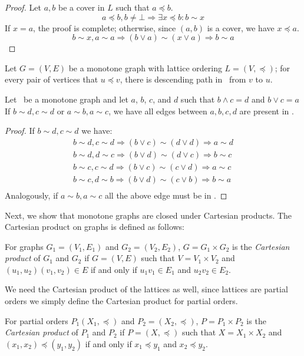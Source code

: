 \begin{proof}
Let \(a,b\) be a cover in \(L\) such that \(a \preceq b\)\@.
\[a \preceq b, b\neq \bot \Rightarrow \exists x \preceq b: b\sim x\]
If \(x=a\), the proof is complete; otherwise, since \((a,b)\) is a cover, we have \(x\preceq a\).
\[b\sim x,a\sim a \Rightarrow (b \vee a) \sim (x \vee a) \Rightarrow b\sim a\]\@
\end{proof}

\begin{cor}
Let \(G=(V,E)\) be a monotone graph with lattice ordering \(L=(V, \preceq)\);
for every pair of vertices that \(u\preceq v\), there is descending path in \mG\ from
\(v\) to \(u\)\@. 
\end{cor}

\begin{lemma}
Let \mG\ be a monotone graph and let
\(a\), \(b\), \(c\), and \(d\) such that \(b \wedge c = d\) and \(b \vee c = a\)
If \(b\sim d, c\sim d\) or \(a\sim b, a\sim c\), we have all edges between 
\(a, b, c, d\) are present in \mG\@.
\end{lemma}

\begin{proof}
If \(b\sim d, c\sim d\) we have:
\begin{eqnarray*}
b\sim d, c\sim d \Rightarrow (b \vee c) \sim (d \vee d) \Rightarrow a\sim d\\
b\sim d, d\sim c \Rightarrow (b \vee d) \sim (d \vee c) \Rightarrow b\sim c\\
b\sim c, c\sim d \Rightarrow (b \vee c) \sim (c \vee d) \Rightarrow a\sim c\\
b\sim c, d\sim b \Rightarrow (b \vee d) \sim (c \vee b) \Rightarrow b\sim a\\
\end{eqnarray*}
Analogously, if \(a\sim b, a\sim c\) all the above edge must be in \mG\@.
\end{proof}

Next, we show that monotone graphs are closed under Cartesian products.
The Cartesian product on graphs is defined as follows:
\begin{defi} 
For graphs \(G_1=(V_1,E_1)\) and \(G_2=(V_2,E_2)\), \(G = G_1 \times G_2\)
is the \emph{Cartesian product} of \(G_1\) and \(G_2\) if \(G=(V,E)\)
such that \(V=V_1 \times V_2\) and \((u_1,u_2)(v_1,v_2) \in E\)
if and only if \(u_1v_1 \in E_1\) and \(u_2v_2 \in E_2\)\@.
\end{defi}

We need the Cartesian product of the lattices as well,
since lattices are partial orders we simply define the Cartesian product
for partial orders.
\begin{defi} 
For partial orders \(P_1(X_1,\preceq)\) and \(P_2=(X_2,\preceq)\), 
\(P= P_1 \times P_2\) is the \emph{Cartesian product} of \(P_1\) and \(P_2\)
if \(P=(X,\preceq)\) such that \(X=X_1\times X_2\) and \((x_1,x_2) \preceq (y_1,y_2)\)
if and only if \(x_1\preceq y_1\) and \(x_2\preceq y_2\)\@.
\end{defi}

